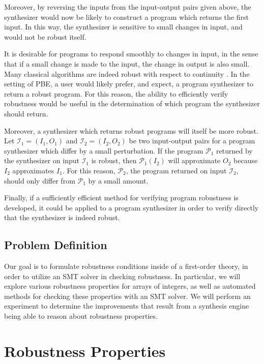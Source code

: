 \documentclass{llncs}
\begin{document}
Moreover, by reversing the inputs from the input-output pairs given above, the synthesizer would now be likely to construct a program which returns the first input.  In this way, the synthesizer is sensitive to small changes in input, and would not be robust itself.

It is desirable for programs to respond smoothly to changes in input, in the sense that if a small change is made to the input, the change in output is also small.  Many classical algorithms are indeed robust with respect to continuity \cite{chaudhuri11}.  In the setting of PBE, a user would likely prefer, and expect, a program synthesizer to return a robust program.  For this reason, the ability to efficiently verify robustness would be useful in the determination of which program the synthesizer should return.

Moreover, a synthesizer which returns robust programs will itself be more robust.  Let \(\mathcal{I}_{1} = (I_{1}, O_{1})\) and \(\mathcal{I}_{2} = (I_{2}, O_{2})\) be two input-output pairs for a program synthesizer which differ by a small perturbation.  If the program \(\mathcal{P}_{1}\) returned by the synthesizer on input \(\mathcal{I}_{1}\) is robust, then \(\mathcal{P}_{1}(I_{2})\) will approximate \(O_{2}\) because \(I_{2}\) approximates \(I_{1}\).  For this reason, \(\mathcal{P}_{2}\), the program returned on input \(\mathcal{I}_{2}\), should only differ from \(\mathcal{P}_{1}\) by a small amount.

Finally, if a sufficiently efficient method for verifying program robustness is developed, it could be applied to a program synthesizer in order to verify directly that the synthesizer is indeed robust.

\subsection{Problem Definition}

Our goal is to formulate robustness conditions inside of a first-order theory, in order to utilize an SMT solver in checking robustness.  In particular, we will explore various robustness properties for arrays of integers, as well as automated methods for checking these properties with an SMT solver.  We will perform an experiment to determine the improvements that result from a synthesis engine being able to reason about robustness properties.

\section{Robustness Properties}
\end{document}
